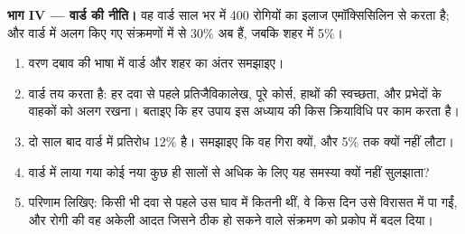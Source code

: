\begin{problem}
\medskip
\noindent\textbf{भाग IV --- वार्ड की नीति।}
वह वार्ड साल भर में 400 रोगियों का इलाज एमॉक्सिसिलिन से करता है; और वार्ड
में अलग किए गए संक्रमणों में से 30\% अब  हैं, जबकि शहर में 5\%।
\begin{enumerate}[resume]
  \item वरण दबाव की भाषा में वार्ड और शहर का अंतर समझाइए।
  \item वार्ड तय करता है: हर दवा से पहले प्रतिजैविकालेख, पूरे कोर्स,
        हाथों की स्वच्छता, और  प्रभेदों के वाहकों को अलग रखना।
        बताइए कि हर उपाय इस अध्याय की किस क्रियाविधि पर काम करता है।
  \item दो साल बाद वार्ड में प्रतिरोध 12\% है। समझाइए कि वह गिरा क्यों,
        और 5\% तक क्यों नहीं लौटा।
  \item वार्ड में लाया गया कोई नया  कुछ ही सालों से अधिक के लिए
        यह समस्या क्यों नहीं सुलझाता?
  \item परिणाम लिखिए: किसी भी दवा से पहले उस घाव में कितनी 
         थीं, वे किस दिन उसे विरासत में पा गईं, और रोगी की वह
        अकेली आदत जिसने ठीक हो सकने वाले संक्रमण को प्रकोप में बदल दिया।
\end{enumerate}
\end{problem}
